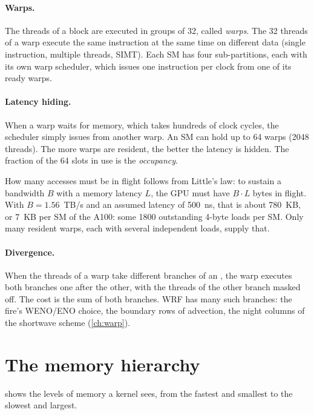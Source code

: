 \paragraph{Warps.} The threads of a block are executed in groups of 32, called \emph{warps}. The 32 threads of a
warp execute the same instruction at the same time on different data (single instruction, multiple threads, SIMT).
Each SM has four sub-partitions, each with its own warp scheduler, which issues one instruction per clock from one
of its ready warps.

\paragraph{Latency hiding.} When a warp waits for memory, which takes hundreds of clock cycles, the scheduler simply
issues from another warp. An SM can hold up to 64 warps (2048 threads). The more warps are resident, the better the
latency is hidden. The fraction of the 64 slots in use is the \emph{occupancy}.

How many accesses must be in flight follows from Little's law: to sustain a bandwidth $B$ with a memory latency
$L$, the GPU must have $B \cdot L$ bytes in flight. With $B = 1.56$~TB/s and an assumed latency of 500~ns, that is
about 780~KB, or 7~KB per SM of the A100: some 1800 outstanding 4-byte loads per SM. Only many resident warps, each
with several independent loads, supply that.

\paragraph{Divergence.} When the threads of a warp take different branches of an , the warp executes both
branches one after the other, with the threads of the other branch masked off. The cost is the sum of both branches.
WRF has many such branches: the fire's WENO/ENO choice, the boundary rows of advection, the night columns of the
shortwave scheme (\cref{ch:warp}).

\section{The memory hierarchy}

 shows the levels of memory a kernel sees, from the fastest and smallest to the slowest and
largest.

